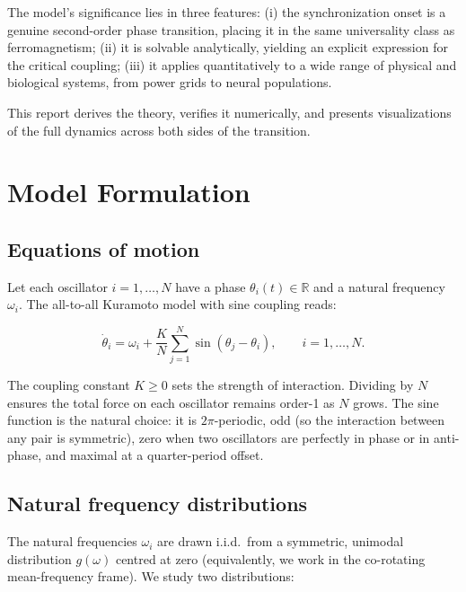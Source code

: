 \documentclass[12pt,a4paper]{article}
\begin{document}
The model's significance lies in three features:
(i) the synchronization onset is a genuine second-order phase transition,
placing it in the same universality class as ferromagnetism;
(ii) it is solvable analytically, yielding an explicit expression for
the critical coupling;
(iii) it applies quantitatively to a wide range of physical and
biological systems, from power grids to neural populations.

This report derives the theory, verifies it numerically, and presents
visualizations of the full dynamics across both sides of the transition.

\section{Model Formulation}
\label{sec:model}

\subsection{Equations of motion}

Let each oscillator $i = 1, \ldots, N$ have a phase $\theta_i(t) \in \mathbb{R}$
and a natural frequency $\omega_i$.
The all-to-all Kuramoto model with sine coupling reads:

\begin{mdframed}[style=keybox]
\begin{equation}
  \dot{\theta}_i = \omega_i + \frac{K}{N}
  \sum_{j=1}^{N} \sin(\theta_j - \theta_i),
  \qquad i = 1, \ldots, N.
  \label{eq:model}
\end{equation}
\end{mdframed}

The coupling constant $K \geq 0$ sets the strength of interaction.
Dividing by $N$ ensures the total force on each oscillator remains
order-1 as $N$ grows.
The sine function is the natural choice: it is $2\pi$-periodic, odd
(so the interaction between any pair is symmetric), zero when two
oscillators are perfectly in phase or in anti-phase, and maximal
at a quarter-period offset.

\subsection{Natural frequency distributions}
\label{sec:dists}

The natural frequencies $\omega_i$ are drawn i.i.d.\ from a symmetric,
unimodal distribution $g(\omega)$ centred at zero (equivalently, we work
in the co-rotating mean-frequency frame).
We study two distributions:
\end{document}
